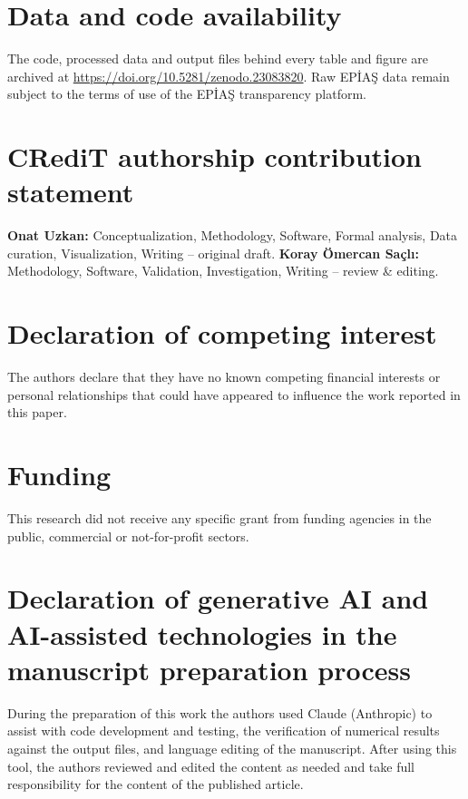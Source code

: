 \documentclass[preprint,12pt,authoryear]{elsarticle}
\begin{document}










\section*{Data and code availability}
The code, processed data and output files behind every table and figure are
archived at \url{https://doi.org/10.5281/zenodo.23083820}. Raw EPİAŞ data
remain subject to the terms of use of the EPİAŞ transparency platform.

\section*{CRediT authorship contribution statement}
\textbf{Onat Uzkan:} Conceptualization, Methodology, Software, Formal
analysis, Data curation, Visualization, Writing -- original draft.
\textbf{Koray Ömercan Saçlı:} Methodology, Software, Validation,
Investigation, Writing -- review \& editing.

\section*{Declaration of competing interest}
The authors declare that they have no known competing financial interests or
personal relationships that could have appeared to influence the work reported
in this paper.

\section*{Funding}
This research did not receive any specific grant from funding agencies in the
public, commercial or not-for-profit sectors.

\section*{Declaration of generative AI and AI-assisted technologies in the
manuscript preparation process}
During the preparation of this work the authors used Claude (Anthropic) to
assist with code development and testing, the verification of numerical
results against the output files, and language editing of the manuscript.
After using this tool, the authors reviewed and edited the content as needed
and take full responsibility for the content of the published article.

\appendix







\end{document}
